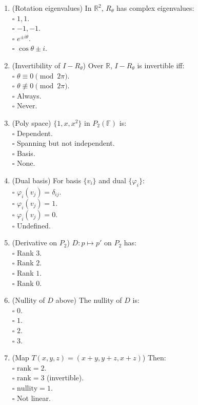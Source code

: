 \documentclass[11pt]{article}
\begin{document}
\begin{enumerate}
\item (Rotation eigenvalues) In $\mathbb{R}^2$, $R_\theta$ has complex eigenvalues:\\
\(\square\) $1,1$.\\
\(\square\) $-1,-1$.\\
\(\square\) $e^{\pm i\theta}$.\\
\(\square\) $\cos\theta\pm i$.

\item (Invertibility of $I-R_\theta$) Over $\mathbb{R}$, $I-R_\theta$ is invertible iff:\\
\(\square\) $\theta\equiv 0\pmod{2\pi}$.\\
\(\square\) $\theta\not\equiv 0\pmod{2\pi}$.\\
\(\square\) Always.\\
\(\square\) Never.

\item (Poly space) $\{1,x,x^2\}$ in $P_2(\mathbb{F})$ is:\\
\(\square\) Dependent.\\
\(\square\) Spanning but not independent.\\
\(\square\) Basis.\\
\(\square\) None.

\item (Dual basis) For basis $\{v_i\}$ and dual $\{\varphi_i\}$:\\
\(\square\) $\varphi_i(v_j)=\delta_{ij}$.\\
\(\square\) $\varphi_i(v_j)=1$.\\
\(\square\) $\varphi_i(v_j)=0$.\\
\(\square\) Undefined.

\item (Derivative on $P_2$) $D:p\mapsto p'$ on $P_2$ has:\\
\(\square\) Rank $3$.\\
\(\square\) Rank $2$.\\
\(\square\) Rank $1$.\\
\(\square\) Rank $0$.

\item (Nullity of $D$ above) The nullity of $D$ is:\\
\(\square\) $0$.\\
\(\square\) $1$.\\
\(\square\) $2$.\\
\(\square\) $3$.

\item (Map $T(x,y,z)=(x+y,y+z,x+z)$) Then:\\
\(\square\) $\mathrm{rank}=2$.\\
\(\square\) $\mathrm{rank}=3$ (invertible).\\
\(\square\) $\mathrm{nullity}=1$.\\
\(\square\) Not linear.


\end{enumerate}
\end{document}
